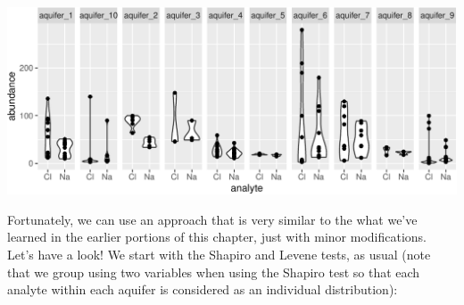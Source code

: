 \documentclass[
]{krantz}
\begin{document}
\begin{center}\includegraphics[width=1\linewidth]{index_files/figure-latex/unnamed-chunk-156-1} \end{center}

Fortunately, we can use an approach that is very similar to the what we've learned in the earlier portions of this chapter, just with minor modifications. Let's have a look! We start with the Shapiro and Levene tests, as usual (note that we group using two variables when using the Shapiro test so that each analyte within each aquifer is considered as an individual distribution):
\end{document}
